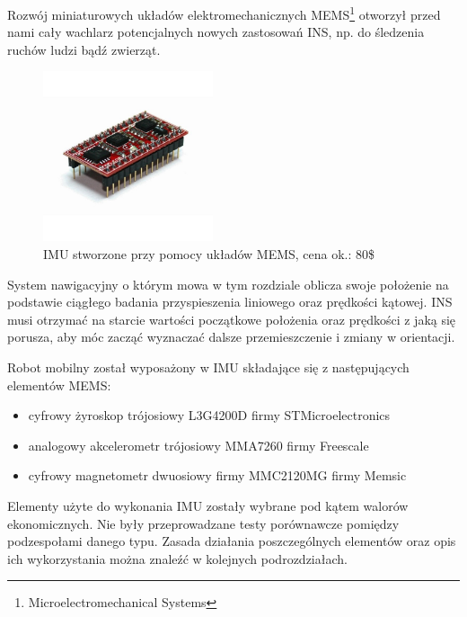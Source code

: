 Rozwój miniaturowych układów elektromechanicznych MEMS\footnote{Microelectromechanical Systems} otworzył przed nami cały
wachlarz potencjalnych nowych zastosowań INS, np. do śledzenia ruchów ludzi bądź
zwierząt.

\begin{figure}[!ht]
 \centering
 \includegraphics[height=50mm]{../images/ch04/mems_imu.jpg}
 \caption[IMU]{IMU stworzone przy pomocy układów MEMS, cena ok.: 80\$\footnotemark}
 \label{fig:Zyrokompas}
\end{figure}

System nawigacyjny o którym mowa w tym rozdziale oblicza swoje położenie na
podstawie ciągłego badania przyspieszenia liniowego oraz prędkości kątowej. INS
musi otrzymać na starcie wartości początkowe położenia oraz prędkości z jaką się
porusza, aby móc zacząć wyznaczać dalsze przemieszczenie i zmiany w orientacji.

Robot mobilny został wyposażony w IMU składające się z następujących elementów MEMS:
\begin{itemize}
  \item cyfrowy żyroskop trójosiowy L3G4200D firmy STMicroelectronics
  \item analogowy akcelerometr trójosiowy MMA7260 firmy Freescale
  \item cyfrowy magnetometr dwuosiowy firmy MMC2120MG firmy Memsic
\end{itemize}
Elementy użyte do wykonania IMU zostały wybrane pod kątem walorów ekonomicznych. 
Nie były przeprowadzane testy porównawcze pomiędzy podzespołami danego typu.
Zasada działania poszczególnych elementów oraz opis ich wykorzystania można znaleźć w kolejnych podrozdziałach.
